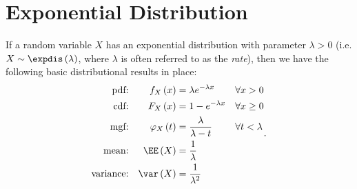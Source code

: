 \documentclass[stat333]{subfiles}
\begin{document}

    \section{Exponential Distribution}
    
    \np If a random variable $X$ has an exponential distribution with parameter $\lambda>0$ (i.e. $X\sim\expdis\left( \lambda \right)$, where $\lambda$ is often referred to as the \textit{rate}), then we have the following basic distributional results in place:
    \begin{equation*}
        \begin{aligned}
            \text{pdf:} && f_X\left( x \right) & = \lambda e^{-\lambda x} && \forall x>0 \\
            \text{cdf:} && F_X\left( x \right) & = 1-e^{-\lambda x} && \forall x\geq 0 \\
            \text{mgf:} && \varphi_X\left( t \right) & = \frac{\lambda}{\lambda-t} && \forall t<\lambda \\
            \text{mean:} && \EE\left( X \right) & = \frac{1}{\lambda} && \\
            \text{variance:} && \var\left( X \right) & = \frac{1}{\lambda^{2}}
        \end{aligned} .
    \end{equation*}
\end{document}
